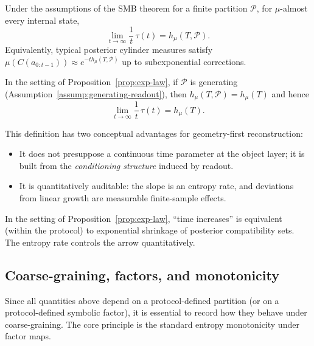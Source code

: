 \begin{proposition}\label{prop:exp-law}
Under the assumptions of the SMB theorem for a finite partition $\mathcal{P}$, for $\mu$-almost every internal state,
\[
\lim_{t\to\infty}\frac{1}{t}\,\tau(t)=h_\mu(T,\mathcal{P}).
\]
Equivalently, typical posterior cylinder measures satisfy $\mu(C(a_{0:t-1}))\approx e^{-t h_\mu(T,\mathcal{P})}$ up to subexponential corrections.
\cite{Walters1982,Petersen1983}
\end{proposition}

\begin{corollary}\label{cor:exp-law-ks}
In the setting of Proposition~\ref{prop:exp-law}, if \(\mathcal{P}\) is generating (Assumption~\ref{assump:generating-readout}), then \(h_\mu(T,\mathcal{P})=h_\mu(T)\) and hence
\[
\lim_{t\to\infty}\frac{1}{t}\,\tau(t)=h_\mu(T).
\]
\end{corollary}

This definition has two conceptual advantages for geometry-first reconstruction:
\begin{itemize}[leftmargin=*,itemsep=2pt]
  \item It does not presuppose a continuous time parameter at the object layer; it is built from the \emph{conditioning structure} induced by readout.
  \item It is quantitatively auditable: the slope is an entropy rate, and deviations from linear growth are measurable finite-sample effects.
\end{itemize}

\begin{corollary}\label{cor:time-arrow}
In the setting of Proposition~\ref{prop:exp-law}, ``time increases'' is equivalent (within the protocol) to exponential shrinkage of posterior compatibility sets. The entropy rate controls the arrow quantitatively.
\end{corollary}

\subsection{Coarse-graining, factors, and monotonicity}\label{sec:info-time:factors}

Since all quantities above depend on a protocol-defined partition (or on a protocol-defined symbolic factor), it is essential to record how they behave under coarse-graining. The core principle is the standard entropy monotonicity under factor maps.

